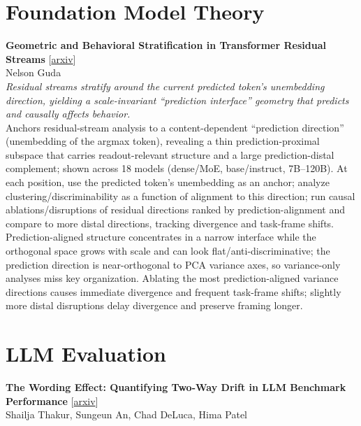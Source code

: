 \documentclass[12pt,letterpaper]{article}
\begin{document}
\medskip


\section*{Foundation Model Theory}

{\small\textbf{Geometric and Behavioral Stratification in Transformer Residual Streams}} {\scriptsize[\href{https://arxiv.org/abs/2608.12447}{arxiv}]}\\
{\scriptsize Nelson Guda}\\

{\small\textit{Residual streams stratify around the current predicted token's unembedding direction, yielding a scale-invariant ``prediction interface'' geometry that predicts and causally affects behavior.}}\\[1pt]
{\footnotesize Anchors residual-stream analysis to a content-dependent ``prediction direction'' (unembedding of the argmax token), revealing a thin prediction-proximal subspace that carries readout-relevant structure and a large prediction-distal complement; shown across 18 models (dense/MoE, base/instruct, 7B--120B). At each position, use the predicted token's unembedding as an anchor; analyze clustering/discriminability as a function of alignment to this direction; run causal ablations/disruptions of residual directions ranked by prediction-alignment and compare to more distal directions, tracking divergence and task-frame shifts. Prediction-aligned structure concentrates in a narrow interface while the orthogonal space grows with scale and can look flat/anti-discriminative; the prediction direction is near-orthogonal to PCA variance axes, so variance-only analyses miss key organization. Ablating the most prediction-aligned variance directions causes immediate divergence and frequent task-frame shifts; slightly more distal disruptions delay divergence and preserve framing longer.}

\medskip


\section*{LLM Evaluation}

{\small\textbf{The Wording Effect: Quantifying Two-Way Drift in LLM Benchmark Performance}} {\scriptsize[\href{https://arxiv.org/abs/2608.11694}{arxiv}]}\\
{\scriptsize Shailja Thakur, Sungeun An, Chad DeLuca, Hima Patel}\\
\end{document}
